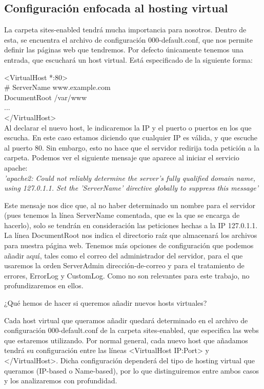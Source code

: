 \documentclass[a4paper, 10pt]{article} %
\begin{document}
\subsection{Configuración enfocada al hosting virtual}

La carpeta sites-enabled tendrá mucha importancia para nosotros. Dentro de esta, se encuentra el archivo de configuración 000-default.conf, que nos permite definir las páginas web que tendremos. Por defecto únicamente tenemos una entrada, que escuchará un host virtual. Está especificado de la siguiente forma: 

<VirtualHost *:80> \\
	\# ServerName www.example.com\\
	DocumentRoot /var/www \\
	...\\
</VirtualHost>\\

Al declarar el nuevo host, le indicaremos la IP y el puerto o puertos en los que escucha. En este caso estamos diciendo que cualquier IP es válida, y que escuche al puerto 80. Sin embargo, esto no hace que el servidor redirija toda petición a la carpeta. Podemos ver el siguiente mensaje que aparece al iniciar el servicio apache: \\
\textit{'apache2: Could not reliably determine the server's fully qualified domain name, using 127.0.1.1. Set the 'ServerName' directive globally to suppress this message'}

Este mensaje nos dice que, al no haber determinado un nombre para el servidor (pues tenemos la línea ServerName comentada, que es la que se encarga de hacerlo), solo se tendrán en consideración las peticiones hechas a la IP 127.0.1.1. La línea DocumentRoot nos indica el directorio raíz que almacenará los archivos para nuestra página web. Tenemos más opciones de configuración que podemos añadir aquí, tales como el correo del administrador del servidor, para el que usaremos la orden ServerAdmin dirección-de-correo y para el tratamiento de errores, ErrorLog y CustomLog. Como no son relevantes para este trabajo, no profundizaremos en ellos. 

¿Qué hemos de hacer si queremos añadir nuevos hosts virtuales? 

Cada host virtual que queramos añadir quedará determinado en el archivo de configuración 000-default.conf de la carpeta sites-enabled, que especifica las webs que estaremos utilizando. Por normal general, cada nuevo host que añadamos tendrá su configuración entre las líneas <VirtualHost IP:Port> y </VirtualHost>. Dicha configuración dependerá del tipo de hosting virtual que queramos (IP-based o Name-based), por lo que distinguiremos entre ambos casos y los analizaremos con profundidad. 
\end{document}
